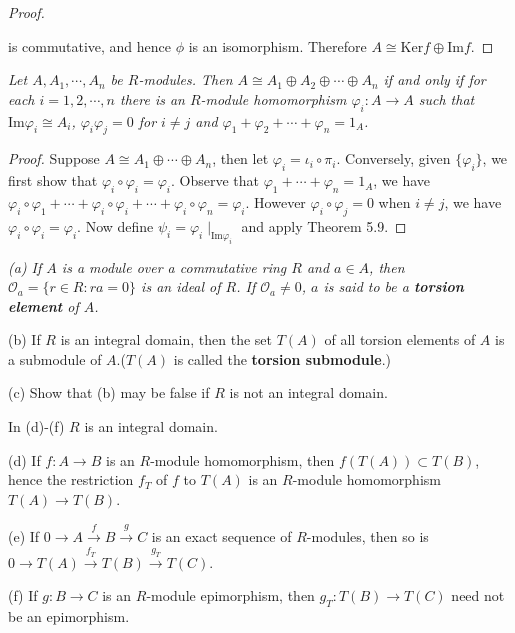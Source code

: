 \begin{proof}
\begin{center}
\begin{tikzpicture}[x=0.75pt,y=0.75pt,yscale=-1,xscale=1]
\end{tikzpicture}
\end{center}
is commutative, and hence $\phi$ is an isomorphism. Therefore $A\cong\mathrm{Ker}f\oplus\mathrm{Im}f$.
\end{proof}
\begin{problem}\em
Let $A,A_1,\cdots,A_n$ be $R$-modules. Then $A\cong A_1\oplus A_2\oplus\cdots\oplus A_n$ if and only if for each $i=1,2,\cdots,n$ there is an $R$-module homomorphism $\varphi_i:A\to A$ such that $\mathrm{Im}\varphi_i\cong A_i$, $\varphi_i\varphi_j=0$ for $i\ne j$ and $\varphi_1+\varphi_2+\cdots+\varphi_n=1_A$.
\end{problem}
\begin{proof}
Suppose $A\cong A_1\oplus\cdots\oplus A_n$, then let $\varphi_i=\iota_i\circ\pi_i$. Conversely, given $\{\varphi_i\}$, we first show that $\varphi_i\circ\varphi_i=\varphi_i$. Observe that $\varphi_1+\cdots+\varphi_n=1_A$, we have $\varphi_i\circ\varphi_1+\cdots+\varphi_i\circ\varphi_i+\cdots+\varphi_i\circ\varphi_n=\varphi_i$. However $\varphi_i\circ\varphi_j=0$ when $i\ne j$, we have $\varphi_i\circ\varphi_i=\varphi_i$. Now define $\psi_i=\varphi_i\mid_{\mathrm{Im}\varphi_i}$ and apply Theorem 5.9.
\end{proof}
\begin{problem}\em
(a) If $A$ is a module over a commutative ring $R$ and $a\in A$, then $\mathcal{O}_a=\{r\in R:ra=0\}$ is an ideal of $R$. If $\mathcal{O}_a\ne 0$, $a$ is said to be a \textbf{torsion element} of $A$.\par
(b) If $R$ is an integral domain, then the set $T(A)$ of all torsion elements of $A$ is a submodule of $A$.($T(A)$ is called the \textbf{torsion submodule}.)\par
(c) Show that (b) may be false if $R$ is not an integral domain.\par
In (d)-(f) $R$ is an integral domain.\par
(d) If $f:A\to B$ is an $R$-module homomorphism, then $f(T(A))\subset T(B)$, hence the restriction $f_T$ of $f$ to $T(A)$ is an $R$-module homomorphism $T(A)\to T(B)$.\par
(e) If $0\longrightarrow A\overset{f}{\longrightarrow}B\overset{g}{\longrightarrow}C$ is an exact sequence of $R$-modules, then so is $0\longrightarrow T\left( A \right) \overset{f_T}{\longrightarrow}T\left( B \right) \overset{g_T}{\longrightarrow}T(C)$.\par
(f) If $g:B\to C$ is an $R$-module epimorphism, then $g_T:T(B)\to T(C)$ need not be an epimorphism.
\end{problem}

